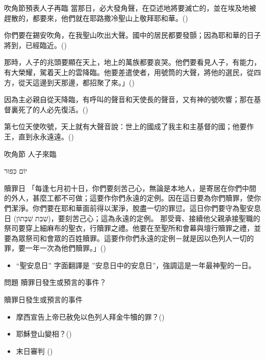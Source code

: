 \documentclass{beamer}
\newcommand{\topic}[1]{
  \begin{frame}
    \centering
    \vspace*{1cm}
    {\fontsize{40}{48}\selectfont #1\par}
    \vfill
  \end{frame}
}
\newcommand{\question}[1]{
  \begin{frame}{問題}
    \centering
    \vspace*{1cm}
    \huge #1？\par
    \vfill
  \end{frame}
}
\newcommand{\conclusion}[2]{
  \begin{frame}
    \centering
    \vspace*{1cm}
    {\fontsize{40}{48}\selectfont #1 \textemdash #2\par}
    \vfill
  \end{frame}
}
\newcommand{\parvspace}{\par\vspace{0.5em}}
\begin{document}
\begin{frame}{吹角節預表人子再臨}
  \alert{當那日，必大發角聲}，在亞述地將要滅亡的，並在埃及地被趕散的，都要來，他們就在耶路撒冷聖山上敬拜耶和華。()\parvspace
  你們要在錫安\alert{吹角}，在我聖山\alert{吹出大聲}。國中的居民都要發顫；因為\alert{耶和華的日子將到，已經臨近}。()\parvspace
  那時，人子的兆頭要顯在天上，地上的萬族都要哀哭。\alert{他們要看見人子，有能力，有大榮耀，駕着天上的雲降臨}。他要差遣使者，用\alert{號筒的大聲}，將他的選民，從四方，從天這邊到天那邊，都招聚了來。」()\parvspace
  因為\alert{主必親自從天降臨}，有呼叫的聲音和天使長的聲音，又有\alert{神的號吹響}；那在基督裏死了的人必先復活。()\parvspace
  第七位天使\alert{吹號}，天上就有大聲音說：世上的國成了我主和主基督的國；他要作王，直到永永遠遠。()\parvspace
\end{frame}

\conclusion{吹角節}{人子來臨}

\topic{\texthebrew{יוֹם כִּפּוּר}}

\begin{frame}{贖罪日}
  「每逢\alert{七月初十日}，你們要刻苦己心，無論是本地人，是寄居在你們中間的外人，甚麼工都不可做；這要作你們永遠的定例。\alert{因在這日要為你們贖罪，使你們潔淨。你們要在耶和華面前得以潔淨，脫盡一切的罪愆}。這日你們要守為\alert{聖安息日 (\texthebrew{שַׁבַּת שַׁבָּתוֹן})}，要刻苦己心；這為永遠的定例。 那受膏、接續他父親承接聖職的祭司要穿上細麻布的聖衣，行贖罪之禮。他要在至聖所和會幕與壇行贖罪之禮，並要為眾祭司和會眾的百姓贖罪。這要作你們永遠的定例－就是因以色列人一切的罪，要一年一次為他們贖罪。」()\parvspace
  \begin{itemize}
    \item “聖安息日” 字面翻譯是 ”安息日中的安息日”，強調這是一年最神聖的一日。
  \end{itemize}
\end{frame}

\question{贖罪日發生或預言的事件}

\begin{frame}{贖罪日發生或預言的事件}
  \begin{itemize}
    \item 摩西宣告上帝已赦免以色列人拜金牛犢的罪？()\parencite{GoldenCalf, SederOlamRabbah, YomKippur}
    \item 耶穌登山變相？()\parencite{YeshuaInYomKippur}
    \item 末日審判 ()
  \end{itemize}
\end{frame}
\end{document}
